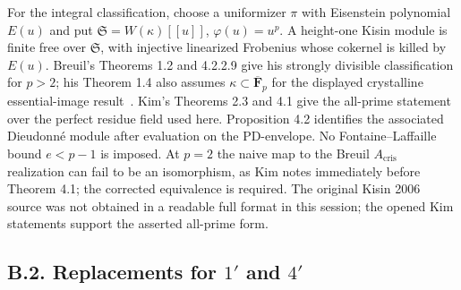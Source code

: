 For the integral classification, choose a uniformizer $\pi$ with
Eisenstein polynomial $E(u)$ and put
$\mathfrak S=W(\kappa)[[u]]$, $\varphi(u)=u^p$. A height-one
Kisin module is finite free over $\mathfrak S$, with injective
linearized Frobenius whose cokernel is killed by $E(u)$.
Breuil's Theorems 1.2 and 4.2.2.9 give his strongly divisible
classification for $p>2$; his Theorem 1.4 also assumes
$\kappa\subset\overline{\mathbf F}_p$ for the displayed
crystalline essential-image result~\cite{Breuil2000}.
Kim's Theorems 2.3 and 4.1 give the all-prime statement over the
perfect residue field used here. Proposition 4.2 identifies the
associated Dieudonn\'e module after evaluation on the PD-envelope.
No Fontaine--Laffaille bound $e<p-1$ is imposed. At $p=2$ the
naive map to the Breuil $A_{\mathrm{cris}}$ realization can fail
to be an isomorphism, as Kim notes immediately before Theorem 4.1;
the corrected equivalence is required. The original Kisin 2006
source was not obtained in a readable full format in this session;
the opened Kim statements support the asserted all-prime form.

\subsection{B.2. Replacements for \texorpdfstring{$1'$ and $4'$}{1-prime and 4-prime}}

